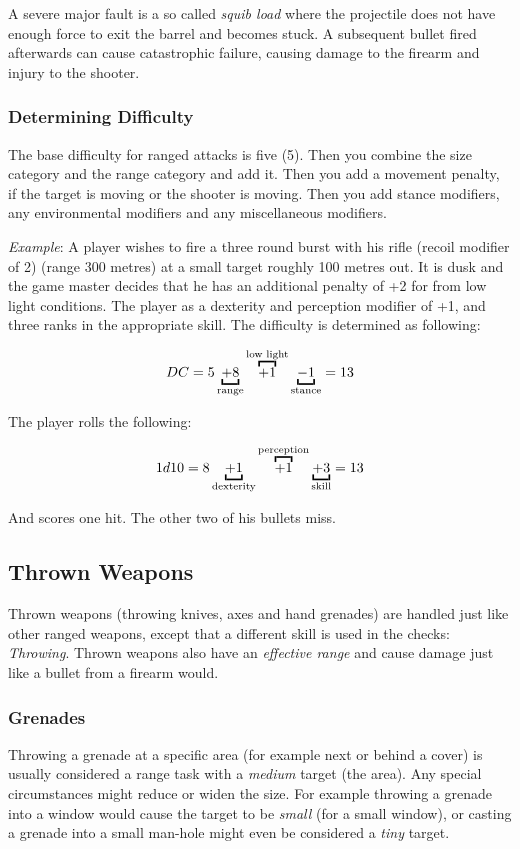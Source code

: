 A severe major fault is a so called \emph{squib load} where the projectile does
not have enough force to exit the barrel and becomes stuck. A subsequent bullet
fired afterwards can cause catastrophic failure, causing damage to the firearm
and injury to the shooter.

\subsubsection{Determining Difficulty}

The base difficulty for ranged attacks is five (5). Then you combine the size
category and the range category and add it. Then you add a movement penalty,
if the target is moving or the shooter is moving. Then you add stance modifiers,
any environmental modifiers and any miscellaneous modifiers.

\emph{Example}: A player wishes to fire a three round burst with his rifle
(recoil modifier of 2) (range 300 metres) at a small target roughly 100 metres
out. It is dusk and the game master decides that he has an additional penalty
of +2 for from low light conditions. The player as a dexterity and perception
modifier of +1, and three ranks in the appropriate skill. The difficulty is
determined as following:

\[
DC = 5 \ub{+ 8}{range} \ob{+ 1}{low light} \ub{- 1}{stance} = 13
\]

The player rolls the following:

\[
1d10 = 8 \ub{+ 1}{dexterity} \ob{+ 1}{perception} \ub{+ 3}{skill} = 13
\]

And scores one hit. The other two of his bullets miss.

\subsection{Thrown Weapons}

Thrown weapons (throwing knives, axes and hand grenades) are handled just like
other ranged weapons, except that a different skill is used in the checks:
\emph{Throwing}. Thrown weapons also have an \emph{effective range} and cause
damage just like a bullet from a firearm would.

\subsubsection{Grenades}

Throwing a grenade at a specific area (for example next or behind a cover) is
usually considered a range task with a \emph{medium} target (the area). Any
special circumstances might reduce or widen the size. For example throwing a
grenade into a window would cause the target to be \emph{small} (for a small
window), or casting a grenade into a small man-hole might even be considered
a \emph{tiny} target.

